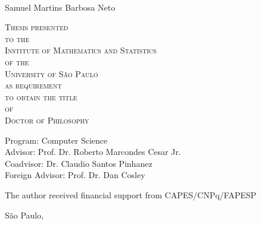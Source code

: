 \documentclass[11pt,twoside,a4paper]{book}
\begin{document}
\hypersetup{pageanchor=false}
\frontmatter
\fancyhead[RO]{{\footnotesize\rightmark}\hspace{2em}\thepage}
\setcounter{tocdepth}{2}
\fancyhead[LE]{\thepage\hspace{2em}\footnotesize{\leftmark}}
\fancyhead[RE,LO]{}
\fancyhead[RO]{{\footnotesize\rightmark}\hspace{2em}\thepage}

\onehalfspacing  %

\thispagestyle{empty}
\begin{center}
    \vspace*{2.3cm}
    \textbf{\Large{\phdTitle}}\\
    
    \vspace*{1.2cm}
    \Large{Samuel Martins Barbosa Neto}
    
    \vskip 2cm
    \textsc{
    Thesis presented\\[-0.25cm] 
    to the\\[-0.25cm]
    Institute of Mathematics and Statistics\\[-0.25cm]
    of the\\[-0.25cm]
    University of São Paulo\\[-0.25cm]
    as requirement\\[-0.25cm]
    to obtain the title\\[-0.25cm]
    of\\[-0.25cm]
    Doctor of Philosophy}
    
    \vskip 1.5cm
    Program: Computer Science\\
    Advisor: Prof. Dr. Roberto Marcondes Cesar Jr.\\
    Coadvisor: Dr. Claudio Santos Pinhanez \\
    Foreign Advisor: Prof. Dr. Dan Cosley

       \vskip 1cm
    \normalsize{The author received financial support from CAPES/CNPq/FAPESP}
    
    \vskip 0.5cm
    \normalsize{São Paulo, \finalMonth~\thesisYear}
\end{center}

\end{document}
